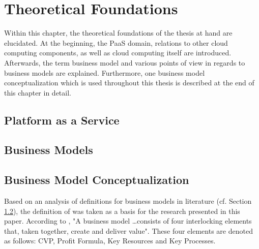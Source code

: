 \chapter{Theoretical Foundations}\label{ch:tf}

Within this chapter, the theoretical foundations of the thesis at hand are elucidated. At the beginning, the \ac{PaaS} domain, relations to other cloud computing components, as well as cloud computing itself are introduced. Afterwards, the term business model and various points of view in regards to business models are explained. Furthermore, one business model conceptualization which is used throughout this thesis is described at the end of this chapter in detail. 

	\section{Platform as a Service}\label{ch:tf:paas}

	\section{Business Models}\label{ch:tf:bm}
	
	
	
\section{Business Model Conceptualization}\label{ch:sota:bmc}

Based on an analysis of definitions for business models in literature (cf. Section \ref{ch:tf:bm}), the definition of \citet{Johnson2008} was taken as a basis for the research presented in this paper. According to \citet[p. 52]{Johnson2008}, "A business model \ldots consists of four interlocking elements that, taken together, create and deliver value". These four elements are denoted as follows: \ac{CVP}, Profit Formula, Key Resources and Key Processes. 

